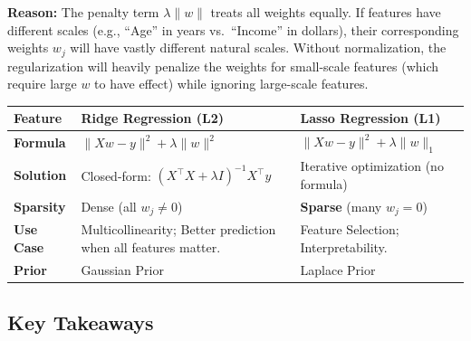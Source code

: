 \documentclass[
  italian,
  11pt,
]{article}
\newcounter{none} %
\begin{document}
\textbf{Reason:} The penalty term \(\lambda \|w\|\) treats all weights
equally. If features have different scales (e.g., ``Age'' in years
vs.~``Income'' in dollars), their corresponding weights \(w_j\) will
have vastly different natural scales. Without normalization, the
regularization will heavily penalize the weights for small-scale
features (which require large \(w\) to have effect) while ignoring
large-scale features.

{\def\LTcaptype{none} %
\begin{longtable}[]{@{}
  >{\raggedright\arraybackslash}p{}
  >{\raggedright\arraybackslash}p{}
  >{\raggedright\arraybackslash}p{}@{}}
\toprule\noalign{}
\begin{minipage}[b]{\linewidth}\raggedright
Feature
\end{minipage} & \begin{minipage}[b]{\linewidth}\raggedright
Ridge Regression (L2)
\end{minipage} & \begin{minipage}[b]{\linewidth}\raggedright
Lasso Regression (L1)
\end{minipage} \\
\midrule\noalign{}
\endhead
\bottomrule\noalign{}
\endlastfoot
\textbf{Formula} & \(\|Xw-y\|^2 + \lambda \|w\|^2\) &
\(\|Xw-y\|^2 + \lambda \|w\|_1\) \\
\textbf{Solution} & Closed-form:
\((X^\top X + \lambda I)^{-1} X^\top y\) & Iterative optimization (no
formula) \\
\textbf{Sparsity} & Dense (all \(w_j \neq 0\)) & \textbf{Sparse} (many
\(w_j = 0\)) \\
\textbf{Use Case} & Multicollinearity; Better prediction when all
features matter. & Feature Selection; Interpretability. \\
\textbf{Prior} & Gaussian Prior & Laplace Prior \\
\end{longtable}
}

\subsection{Key Takeaways}\label{key-takeaways-7}
\end{document}
